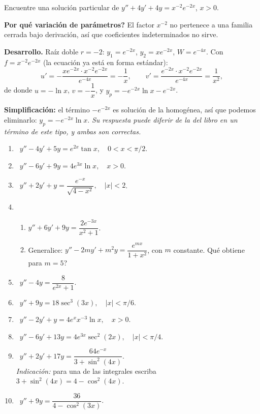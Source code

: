 \begin{example}
    Encuentre una soluci\'on particular de $y''+4y'+4y=x^{-2}e^{-2x}$, $x>0$.

    \textbf{\textquestiondown Por qu\'e variaci\'on de par\'ametros?} El factor $x^{-2}$ no pertenece a una familia cerrada bajo derivaci\'on, as\'i que coeficientes indeterminados no sirve.

    \textbf{Desarrollo.} Ra\'iz doble $r=-2$: $y_1=e^{-2x}$, $y_2=xe^{-2x}$, $W=e^{-4x}$. Con $f=x^{-2}e^{-2x}$ (la ecuaci\'on ya est\'a en forma est\'andar):
    \[
    u'=-\dfrac{xe^{-2x}\cdot x^{-2}e^{-2x}}{e^{-4x}}=-\dfrac1x,\qquad v'=\dfrac{e^{-2x}\cdot x^{-2}e^{-2x}}{e^{-4x}}=\dfrac{1}{x^2},
    \]
    de donde $u=-\ln x$, $v=-\dfrac1x$, y $y_p=-e^{-2x}\ln x-e^{-2x}$.

    \textbf{Simplificaci\'on:} el t\'ermino $-e^{-2x}$ es soluci\'on de la homog\'enea, as\'i que podemos eliminarlo: $y_p=-e^{-2x}\ln x$. \emph{Su respuesta puede diferir de la del libro en un t\'ermino de este tipo, y ambas son correctas.}
\end{example}

\begin{enumerate}[label=\textbf{C\arabic*.}, leftmargin=*]
    \item \facil\ $y''-4y'+5y=e^{2x}\tan x,\quad 0<x<\pi/2$.
    \item \facil\ $y''-6y'+9y=4e^{3x}\ln x,\quad x>0$.
    \item \facil\ $y''+2y'+y=\dfrac{e^{-x}}{\sqrt{4-x^2}},\quad |x|<2$.
    \item \medio\ \begin{enumerate}[label=\alph*)]
        \item $y''+6y'+9y=\dfrac{2e^{-3x}}{x^2+1}$.
        \item Generalice: $y''-2my'+m^2y=\dfrac{e^{mx}}{1+x^2}$, con $m$ constante. \textquestiondown Qu\'e obtiene para $m=5$?
    \end{enumerate}
    \item \medio\ $y''-4y=\dfrac{8}{e^{2x}+1}$.
    \item \medio\ $y''+9y=18\sec^3(3x),\quad |x|<\pi/6$.
    \item \medio\ $y''-2y'+y=4e^xx^{-3}\ln x,\quad x>0$.
    \item \medio\ $y''-6y'+13y=4e^{3x}\sec^2(2x),\quad |x|<\pi/4$.
    \item \dificil\ $y''+2y'+17y=\dfrac{64e^{-x}}{3+\sin^2(4x)}$.\\
    \textit{Indicaci\'on:} para una de las integrales escriba $3+\sin^2(4x)=4-\cos^2(4x)$.
    \item \dificil\ $y''+9y=\dfrac{36}{4-\cos^2(3x)}$.
\end{enumerate}

